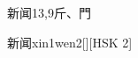 \begin{entry}{新闻}{13,9}{⽄、⾨}
  \begin{phonetics}{新闻}{xin1wen2}[][HSK 2]
  \end{phonetics}
\end{entry}
